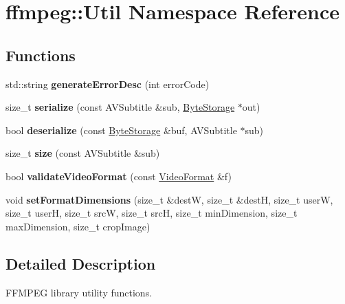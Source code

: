 \hypertarget{namespaceffmpeg_1_1Util}{}\section{ffmpeg\+:\+:Util Namespace Reference}
\label{namespaceffmpeg_1_1Util}
\subsection*{Functions}
\begin{DoxyCompactItemize}
\item 
\mbox{\label{namespaceffmpeg_1_1Util_ac4cd952c3091a2d209145d11fa845d4d}} 
std\+::string {\bfseries generate\+Error\+Desc} (int error\+Code)
\item 
\mbox{\label{namespaceffmpeg_1_1Util_a004ff7af91911e3d6032c904a9a01cdb}} 
size\+\_\+t {\bfseries serialize} (const A\+V\+Subtitle \&sub, \hyperlink{classffmpeg_1_1ByteStorage}{Byte\+Storage} $\ast$out)
\item 
\mbox{\label{namespaceffmpeg_1_1Util_a7fd684ad88902222350da8f939841675}} 
bool {\bfseries deserialize} (const \hyperlink{classffmpeg_1_1ByteStorage}{Byte\+Storage} \&buf, A\+V\+Subtitle $\ast$sub)
\item 
\mbox{\label{namespaceffmpeg_1_1Util_a78a566764eb50283a7a9ebaaecf472b9}} 
size\+\_\+t {\bfseries size} (const A\+V\+Subtitle \&sub)
\item 
\mbox{\label{namespaceffmpeg_1_1Util_a466bf07131b7c64bcd0da170112f7847}} 
bool {\bfseries validate\+Video\+Format} (const \hyperlink{structffmpeg_1_1VideoFormat}{Video\+Format} \&f)
\item 
\mbox{\label{namespaceffmpeg_1_1Util_acfd67a728ec5fdabe038f80f48949763}} 
void {\bfseries set\+Format\+Dimensions} (size\+\_\+t \&destW, size\+\_\+t \&destH, size\+\_\+t userW, size\+\_\+t userH, size\+\_\+t srcW, size\+\_\+t srcH, size\+\_\+t min\+Dimension, size\+\_\+t max\+Dimension, size\+\_\+t crop\+Image)
\end{DoxyCompactItemize}


\subsection{Detailed Description}
F\+F\+M\+P\+EG library utility functions. 